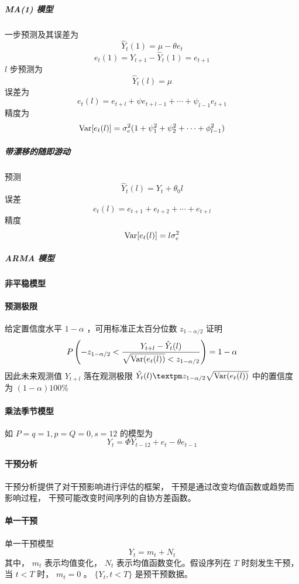 \documentclass[UTF8,hyperref,a4paper]{ctexart}
\begin{document}
        \subparagraph{MA(1) 模型} 一步预测及其误差为
        $$ \hat{Y}_t(1) = \mu - \theta e_t $$
        $$ e_t(1) = Y_{t+1} - \hat{Y}_t(1) = e_{t+1} $$
        $ l $ 步预测为 $$ \hat{Y}_t(l) = \mu $$ 
        误差为  $$ e_t(l) = e_{t+l} + \psi e_{t+l-1} + \cdots + \psi_{l-1} e_{t+1} $$ 
        精度为 $$ \mathrm{Var} [e_t(l)] = \sigma_e^2 (1+\psi_1^2 + \psi_2^2 + \cdots + \phi_{l-1}^2) $$ 

        \subparagraph{带漂移的随即游动} 预测
        $$ \hat{Y}_t(l) = Y_t + \theta_0 l $$
        误差 $$ e_t(l) = e_{t+1} + e_{t+2} + \cdots + e_{t+l} $$ 
        精度 $$ \mathrm{Var} [e_t(l)] = l \sigma_e^2 $$ 

        \subparagraph{ARMA 模型}

        \paragraph{非平稳模型}

        \paragraph{预测极限} 给定置信度水平 $ 1- \alpha $ ，可用标准正太百分位数 $ z_{1 - \alpha /2} $ 证明
        $$ P \left( -z_{1-\alpha/2} < \displaystyle{\frac{\displaystyle{Y_{t+l} - \hat{Y}_t(l)}}{\displaystyle{\sqrt{\mathrm{Var}(e_t(l))} < z_{1-\alpha/2}}}} \right) = 1 - \alpha $$ 
        因此未来观测值 $ Y_{t+l} $ 落在观测极限 $ \hat{Y_t}(l) ± z_{1-\alpha/2}\sqrt{\Var(e_t(l))} $ 
        中的置信度为 $ (1-\alpha) 100\% $
        
        \paragraph{乘法季节模型} 如 $ P = q = 1, p = Q = 0, s = 12 $ 的模型为
        $$ Y_t = \Phi Y_{t - 12} + e_t - \theta e_{t - 1} $$

        \paragraph{干预分析} 干预分析提供了对干预影响进行评估的框架，
        干预是通过改变均值函数或趋势而影响过程，
        干预可能改变时间序列的自协方差函数。

        \paragraph{单一干预} 单一干预模型 $$ Y_t = m_t + N_t $$ 其中，
        $ m_t $ 表示均值变化， $ N_t $ 表示均值函数变化。假设序列在 $ T $ 时刻发生干预，
        当 $ t<T $ 时， $ m_t = 0 $ 。 $ \{Y_t, t < T\} $ 是预干预数据。
\end{document}
